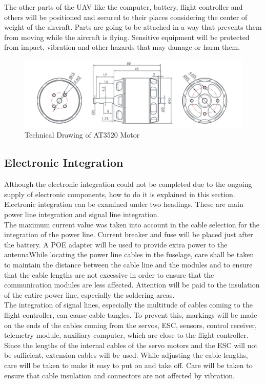 \documentclass[12pt]{article}
\begin{document}
\justify
The other parts of the UAV like the computer, battery, flight controller and others will be positioned and secured to their places considering the center of weight of the aircraft. Parts are going to be attached in a way that prevents them from moving while the aircraft is flying. Sensitive equipment will be protected from impact, vibration and other hazards that may damage or harm them.\\

\begin{figure}[ht]
 	\centering
 	\includegraphics[width = .5\linewidth]{motor_tech.jpg}
 	\caption{Technical Drawing of AT3520 Motor\cite{at3520}}
        \label{fig:DC_Motor}
 \end{figure}
\FloatBarrier

\subsection{Electronic Integration}

Although the electronic integration could not be completed due to the ongoing supply of electronic components, how to do it is explained in this section. Electronic integration can be examined under two headings. These are main power line integration and signal line integration.\\

\justify
The maximum current value was taken into account in the cable selection for the integration of the power line. Current breaker and fuse will be placed just after the battery. A POE adapter will be used to provide extra power to the antennaWhile locating the power line cables in the fuselage, care shall be taken to maintain the distance between the cable line and the modules and to ensure that the cable lengths are not excessive in order to ensure that the communication modules are less affected. Attention will be paid to the insulation of the entire power line, especially the soldering areas.\\

\justify
The integration of signal lines, especially the multitude of cables coming to the flight controller, can cause cable tangles. To prevent this, markings will be made on the ends of the cables coming from the servos, ESC, sensors, control receiver, telemetry module, auxiliary computer, which are close to the flight controller. Since the lengths of the internal cables of the servo motors and the ESC will not be sufficient, extension cables will be used. While adjusting the cable lengths, care will be taken to make it easy to put on and take off. Care will be taken to ensure that cable insulation and connectors are not affected by vibration.\\
\end{document}
